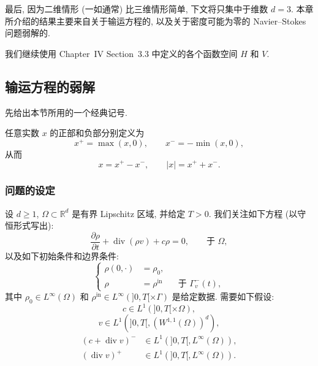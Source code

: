 \begin{sloppypar}
最后, 因为二维情形 (一如通常) 比三维情形简单, 下文将只集中于维数 $d=3$. 本章所介绍的结果主要来自关于输运方程的, 以及关于密度可能为零的 Navier--Stokes 问题弱解的.

我们继续使用 Chapter~IV Section~3.3 中定义的各个函数空间 $H$ 和 $V$.

\subsection{输运方程的弱解}
\label{sec:chap6-weak-transport}

先给出本节所用的一个经典记号.

\begin{Definition}
\label{def:chap6-positive-negative-parts}
任意实数 $x$ 的正部和负部分别定义为
\[
 x^+=\max(x,0),\qquad x^-=-\min(x,0),
\]
从而
\[
 x=x^+-x^-,\qquad |x|=x^++x^-.
\]
\end{Definition}

\subsubsection{问题的设定}
\label{subsec:chap6-transport-setting}

设 $d\geq1$, $\Omega\subset\mathbb R^d$ 是有界 Lipschitz 区域, 并给定 $T>0$. 我们关注如下方程 (以守恒形式写出):
\begin{equation}
 \frac{\partial\rho}{\partial t}+\operatorname{div}(\rho v)+c\rho=0,
 \qquad\text{于 }\Omega,
\label{eq:chap6-linear-transport-reaction}
\end{equation}
以及如下初始条件和边界条件:
\begin{equation}
 \left\{
 \begin{aligned}
 \rho(0,\cdot)&=\rho_0,\\
 \rho&=\rho^{\mathrm{in}}&&\text{于 }\Gamma_v^-(t),
 \end{aligned}
 \right.
\label{eq:chap6-transport-initial-boundary}
\end{equation}
其中 $\rho_0\in L^\infty(\Omega)$ 和 $\rho^{\mathrm{in}}\in L^\infty(]0,T[\times\Gamma)$ 是给定数据. 需要如下假设:
\begin{equation}
 c\in L^1(]0,T[\times\Omega),
\label{eq:chap6-transport-c-assumption}
\end{equation}
\begin{equation}
 v\in L^1(]0,T[,(W^{1,1}(\Omega))^d),
\label{eq:chap6-transport-v-assumption}
\end{equation}
\begin{subequations}
\label{eq:chap6-transport-sign-assumptions}
\begin{align}
 (c+\operatorname{div}v)^-&\in L^1(]0,T[,L^\infty(\Omega)),
\label{eq:chap6-transport-negative-assumption}\\
 (\operatorname{div}v)^+&\in L^1(]0,T[,L^\infty(\Omega)).
\label{eq:chap6-transport-div-positive-assumption}
\end{align}
\end{subequations}


\end{sloppypar}

